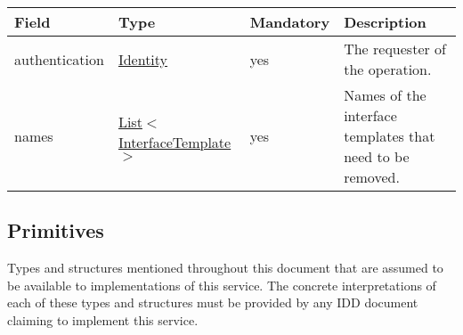 \documentclass[a4paper]{arrowhead}
\newcommand{\pref}[1]{{\textcolor{ArrowheadGrey}{\hyperref[sec:model:primitives:#1]{#1}}}}
\begin{document}
\label{sec:model:InterfaceTemplateRemoveRequest}

\begin{table}[ht!]
\begin{tabularx}{\textwidth}{| p{2.5cm} | p{3.8cm} | p{2cm} | X |} \hline
\rowcolor{gray!33} Field & Type & Mandatory & Description \\ \hline
authentication & \hyperref[sec:model:Identity]{Identity} & yes & The requester of the operation. \\ \hline
names &  \pref{List}$<$\pref{InterfaceTemplate}$>$ & yes & Names of the interface templates that need to be removed. \\ \hline
\end{tabularx}
\end{table}

\subsection{Primitives}
\label{sec:model:primitives}

Types and structures mentioned throughout this document that are assumed to be available to implementations of this service.
The concrete interpretations of each of these types and structures must be provided by any IDD document claiming to implement this service.
\end{document}
